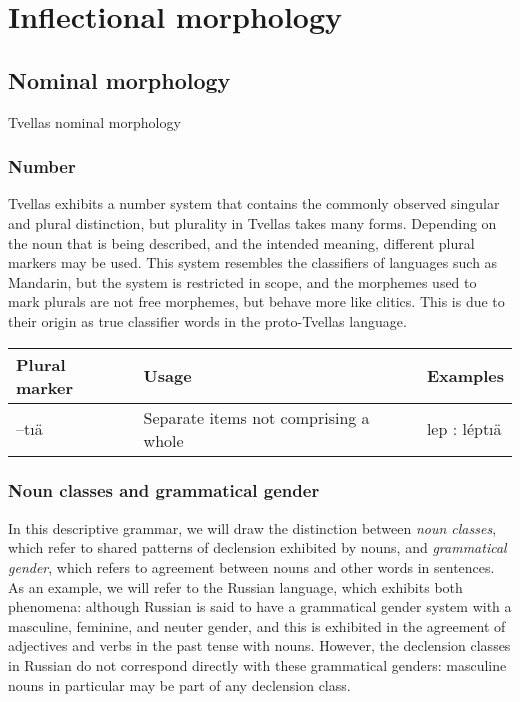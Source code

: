 \chapter{Inflectional morphology}

\section{Nominal morphology}

Tvellas nominal morphology

\subsection{Number}

Tvellas exhibits a number system that contains the commonly observed singular and plural
distinction, but plurality in Tvellas takes many forms. Depending on the noun that is being
described, and the intended meaning, different plural markers may be used. This system resembles the
classifiers of languages such as Mandarin, but the system is restricted in scope, and the morphemes
used to mark plurals are not free morphemes, but behave more like clitics. This is due to their 
origin as true classifier words in the proto-Tvellas language.

\begin{center}
    \begin{tabularx}{\columnwidth}{| l | X | l |}
        \hline
        \textbf{Plural marker} & \textbf{Usage} & \textbf{Examples} \\
        \hline \hline
        --tıä & Separate items not comprising a whole & lep : léptıä \\
        \hline
    \end{tabularx}
\end{center}

\subsection{Noun classes and grammatical gender}

In this descriptive grammar, we will draw the distinction between \textit{noun classes}, which refer
to shared patterns of declension exhibited by nouns, and \textit{grammatical gender}, which refers
to agreement between nouns and other words in sentences. As an example, we will refer to the Russian
language, which exhibits both phenomena: although Russian is said to have a grammatical gender
system with a masculine, feminine, and neuter gender, and this is exhibited in the agreement of
adjectives and verbs in the past tense with nouns. However, the declension classes in Russian do not
correspond directly with these grammatical genders: masculine nouns in particular may be part of any
declension class.

